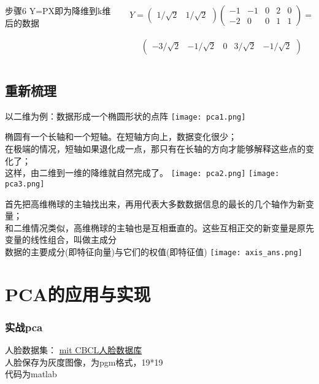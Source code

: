   \begin{frame}
  \begin{columns}
  \column{2cm}
  \begin{block}{步骤6}
Y=PX即为降维到k维后的数据
\end{block}
  \column{6cm}
  \begin{example}
  \[Y=\begin{pmatrix}
  1/\sqrt{2} & 1/\sqrt{2}
\end{pmatrix}\begin{pmatrix}
  -1 & -1 & 0 & 2 & 0 \\
  -2 & 0 & 0 & 1 & 1
\end{pmatrix}= \] \\ \[ \begin{pmatrix}
  -3/\sqrt{2} &-1/\sqrt{2} & 0 & 3/ \sqrt{2} & -1/\sqrt{2}
\end{pmatrix}\]
\end{example}
  \end{columns}
  \end{frame}
  
 \subsection{重新梳理}
 \begin{frame}
以二维为例：数据形成一个椭圆形状的点阵
\texttt{[image: pca1.png]}
 \end{frame}
 
\begin{frame}
椭圆有一个长轴和一个短轴。在短轴方向上，数据变化很少；\\
在极端的情况，短轴如果退化成一点，那只有在长轴的方向才能够解释这些点的变化了；\\
这样，由二维到一维的降维就自然完成了。
\texttt{[image: pca2.png]}
\texttt{[image: pca3.png]}
\end{frame}

\begin{frame}
首先把高维椭球的主轴找出来，再用代表大多数数据信息的最长的几个轴作为新变量；\\
和二维情况类似，高维椭球的主轴也是互相垂直的。这些互相正交的新变量是原先变量的线性组合，叫做主成分\\
数据的主要成分(即特征向量)与它们的权值(即特征值)
\texttt{[image: axis\_ans.png]}
\end{frame}


\section{PCA的应用与实现}
\begin{frame}
\frametitle{实战pca}
人脸数据集：
\href{www.cbcl.mit.edu/software-datasets/FaceData2.html}{mit CBCL人脸数据库}\\
人脸保存为灰度图像，为pgm格式，19*19\\
代码为matlab
\end{frame}




